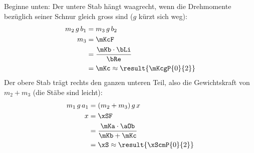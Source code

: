 Beginne unten: Der untere Stab hängt waagrecht, wenn die Drehmomente bezüglich seiner Schnur gleich gross sind ($g$ kürzt sich weg):
\begin{align}
 m_2\,g\,b_1 &= m_3\,g\,b_2 \\
 m_3 &= \mKcF \\
   &= \frac{\mKb\cdot\bLi}{\bRe} \\
   &= \mKc \approx \result{\mKcgP{0}{2}}
\end{align}
Der obere Stab trägt rechts den ganzen unteren Teil, also die Gewichtskraft von $m_2+m_3$ (die Stäbe sind leicht):
\begin{align}
 m_1\,g\,a_1 &= (m_2+m_3)\,g\,x \\
 x &= \xSF \\
   &= \frac{\mKa\cdot\aOb}{\mKb+\mKc} \\
   &= \xS \approx \result{\xScmP{0}{2}}
\end{align}
